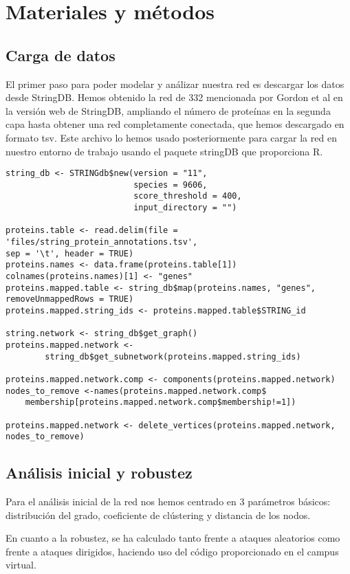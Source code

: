 \section{Materiales y métodos}
\subsection{Carga de datos}
El primer paso para poder modelar y análizar nuestra red es descargar los datos desde StringDB.
Hemos obtenido la red de 332 mencionada por Gordon et al en la versión web de StringDB, ampliando el número de proteínas en la segunda capa hasta obtener una red completamente conectada, que hemos descargado en formato tsv. Este archivo lo hemos usado posteriormente para cargar la red en nuestro entorno de trabajo usando el paquete stringDB que proporciona R.

\begin{lstlisting}
string_db <- STRINGdb$new(version = "11", 
                          species = 9606, 
                          score_threshold = 400, 
                          input_directory = "")

proteins.table <- read.delim(file = 'files/string_protein_annotations.tsv', 
sep = '\t', header = TRUE)
proteins.names <- data.frame(proteins.table[1])
colnames(proteins.names)[1] <- "genes"
proteins.mapped.table <- string_db$map(proteins.names, "genes",
removeUnmappedRows = TRUE)
proteins.mapped.string_ids <- proteins.mapped.table$STRING_id

string.network <- string_db$get_graph()
proteins.mapped.network <-
        string_db$get_subnetwork(proteins.mapped.string_ids)

proteins.mapped.network.comp <- components(proteins.mapped.network)
nodes_to_remove <-names(proteins.mapped.network.comp$
    membership[proteins.mapped.network.comp$membership!=1]) 

proteins.mapped.network <- delete_vertices(proteins.mapped.network,
nodes_to_remove)

\end{lstlisting}


\subsection{Análisis inicial y robustez}
Para el análisis inicial de la red nos hemos centrado en 3 parámetros básicos: distribución del grado, coeficiente de clústering y distancia de los nodos. 

En cuanto a la robustez, se ha calculado tanto frente a ataques aleatorios como frente a ataques dirigidos, haciendo uso del código proporcionado en el campus virtual.

